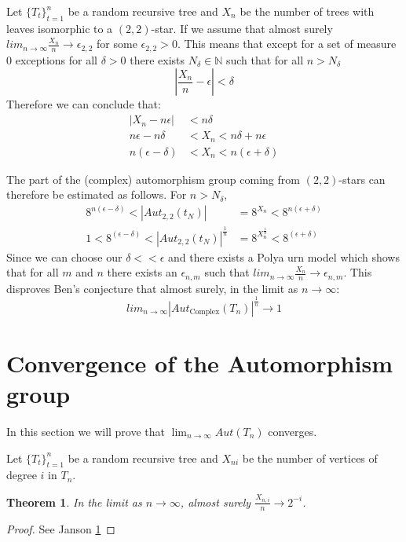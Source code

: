 \documentclass[oneside]{book} %
\newtheorem{thm}{Theorem}[section]
\theoremstyle{definition}
\numberwithin{equation}{section}
\begin{document}
 Let $\{T_t\}_{t=1}^{n}$ be a random recursive tree and $X_{n}$ be the number of trees with leaves  isomorphic to a $(2,2)$-star.
 If we assume that almost surely $lim_{n \rightarrow \infty} \frac{X_n}{n} \rightarrow \epsilon_{2,2}$ for some $\epsilon_{2,2}> 0$.  This means that except for a set of measure 0 exceptions for all $\delta > 0$ there exists $N_\delta \in \mathbb{N}$ such that for all $n >N_\delta$ 
 \[ | \frac{X_n}{n}  - \epsilon| < \delta\]
 Therefore we can conclude that:
 \begin{align}
  |X_n  - n\epsilon| &< n \delta \\
 n\epsilon - n\delta  &< X_n < n \delta + n\epsilon \\
n(\epsilon - \delta) &< X_n < n(\epsilon + \delta)  
 \end{align}


 
 The part of the (complex) automorphism group coming from $(2,2)$-stars can therefore be estimated as follows.  For $n >N_\delta$, 
 \begin{align}
 8^{n(\epsilon - \delta)}<|Aut_{2,2}(t_N)| & = 8^{X_n} < 8^{ n(\epsilon + \delta) } \\
 1 < 8^{(\epsilon - \delta)}<|Aut_{2,2}(t_N)|^{\frac{1}{n}} & = 8^{X^{\frac{1}{n}}_n} < 8^{ (\epsilon + \delta) }
 \end{align}
Since we can choose our $\delta << \epsilon$ and there exists a Polya urn model which shows that for all $m$ and $n$ there exists an $\epsilon_{n,m}$ such that $lim_{n \rightarrow \infty} \frac{X_n}{n} \rightarrow \epsilon_{n,m}$. This disproves Ben's conjecture that almost surely, in the limit as $n \rightarrow \infty$: 
\[lim_{n \rightarrow \infty}  |Aut_{\text{Complex}}(T_n)|^{\frac{1}{n}} \rightarrow 1\]
 
\section{Convergence of the Automorphism group}%
 
 In this section we will prove that $\lim_{n \rightarrow \infty} Aut(T_n)$ converges.   
 
 Let $\{T_t\}_{t=1}^{n}$ be a random recursive tree and $X_{ni}$ be the number of vertices of degree $i$ in $T_n$.
 
\begin{thm}
 In the limit as $n \rightarrow \infty$, almost surely $\frac{X_{n,i}}{n} \rightarrow 2^{-i}$. 
\end{thm}
\begin{proof}
 See Janson \ref{}
\end{proof}
\end{document}
